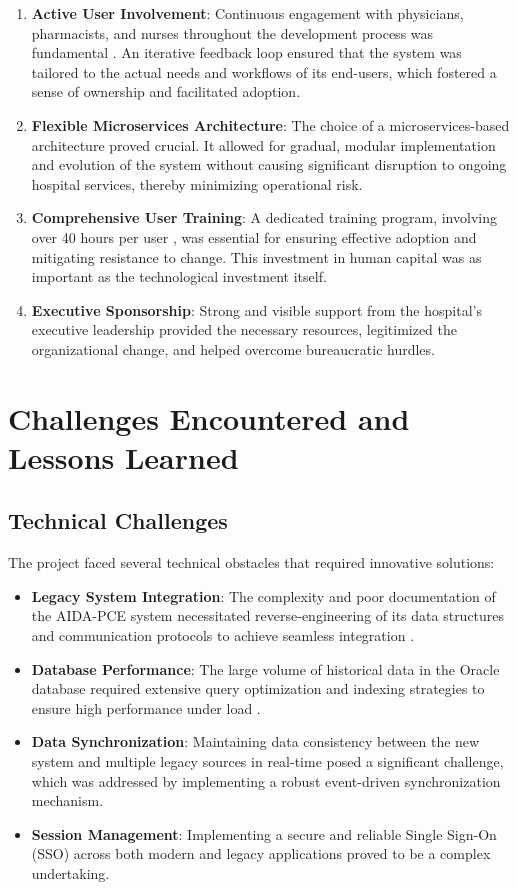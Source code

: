 \begin{enumerate}
    \item \textbf{Active User Involvement}: Continuous engagement with physicians, pharmacists, and nurses throughout the development process was fundamental \cite{venkatesh2003}. An iterative feedback loop ensured that the system was tailored to the actual needs and workflows of its end-users, which fostered a sense of ownership and facilitated adoption.
    \item \textbf{Flexible Microservices Architecture}: The choice of a microservices-based architecture \cite{newman2021} proved crucial. It allowed for gradual, modular implementation and evolution of the system without causing significant disruption to ongoing hospital services, thereby minimizing operational risk.
    \item \textbf{Comprehensive User Training}: A dedicated training program, involving over 40 hours per user \cite{kvarnstrom2023}, was essential for ensuring effective adoption and mitigating resistance to change. This investment in human capital was as important as the technological investment itself.
    \item \textbf{Executive Sponsorship}: Strong and visible support from the hospital's executive leadership provided the necessary resources, legitimized the organizational change, and helped overcome bureaucratic hurdles.
\end{enumerate}

\section{Challenges Encountered and Lessons Learned}

\subsection{Technical Challenges}

The project faced several technical obstacles that required innovative solutions:
\begin{itemize}
    \item \textbf{Legacy System Integration}: The complexity and poor documentation of the AIDA-PCE system necessitated reverse-engineering of its data structures and communication protocols to achieve seamless integration \cite{keasberry2017}.
    \item \textbf{Database Performance}: The large volume of historical data in the Oracle database required extensive query optimization and indexing strategies to ensure high performance under load \cite{jiang2014}.
    \item \textbf{Data Synchronization}: Maintaining data consistency between the new system and multiple legacy sources in real-time posed a significant challenge, which was addressed by implementing a robust event-driven synchronization mechanism.
    \item \textbf{Session Management}: Implementing a secure and reliable Single Sign-On (SSO) across both modern and legacy applications proved to be a complex undertaking.
\end{itemize}

